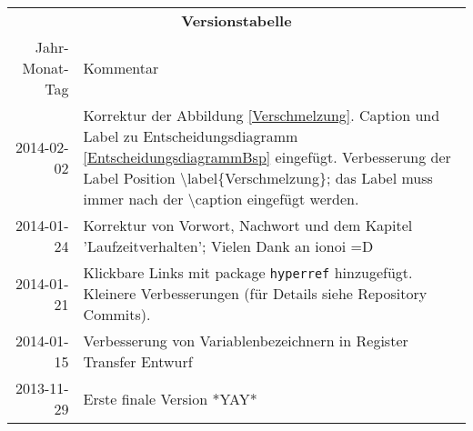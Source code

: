 \begin{table}[htp]
\centering
\begin{tabularx}{\columnwidth}{rp{}}
\multicolumn{2}{c}{\textbf{Versionstabelle}} \\
Jahr-Monat-Tag & Kommentar \\ \hline
2014-02-02 & Korrektur der Abbildung \ref{Verschmelzung}.
Caption und Label zu Entscheidungsdiagramm \ref{EntscheidungsdiagrammBsp} eingefügt.
Verbesserung der Label Position \textbackslash label\{Verschmelzung\}; das Label muss immer nach der \textbackslash caption eingefügt werden.
\\
2014-01-24 & Korrektur von Vorwort, Nachwort und dem Kapitel 'Laufzeitverhalten'; Vielen Dank an ionoi =D \\
2014-01-21 & Klickbare Links mit package \texttt{hyperref} hinzugefügt.
                     Kleinere Verbesserungen (für Details siehe Repository Commits).
\\
2014-01-15 & Verbesserung von Variablenbezeichnern in Register Transfer Entwurf \\
2013-11-29 & Erste finale Version *YAY* \\
\end{tabularx}
\end{table}